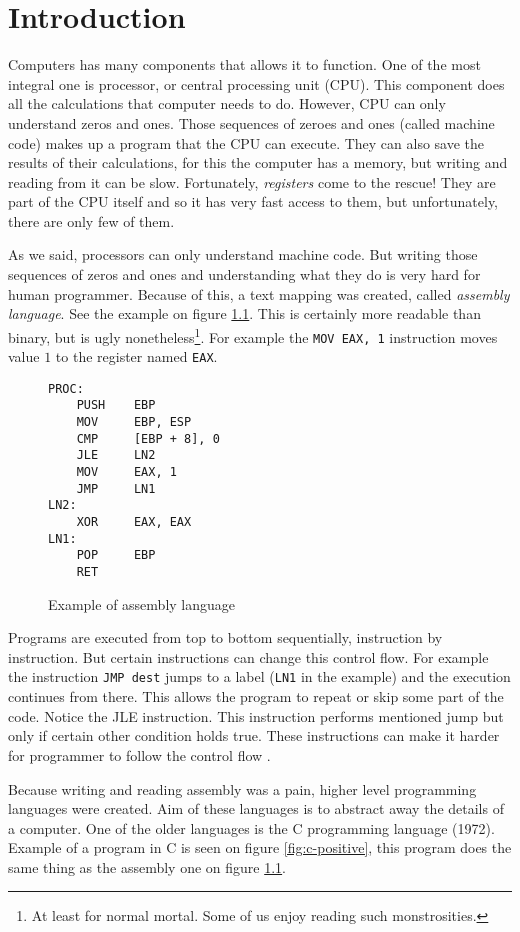 \chapter{Introduction}
Computers has many components that allows it to function. One of the most
integral one is processor, or central processing unit (CPU). This component
does all the calculations that computer needs to do. However, CPU can only
understand zeros and ones. Those sequences of zeroes and ones (called machine
code) makes up a program that the CPU can execute. They can also save the
results of their calculations, for this the computer has a memory, but writing
and reading from it can be slow. Fortunately, \textit{registers} come to the
rescue! They are part of the CPU itself and so it has very fast access to them,
but unfortunately, there are only few of them.

As we said, processors can only understand machine code. But writing those
sequences of zeros and ones and understanding what they do is very hard for
human programmer. Because of this, a text mapping was created, called
\textit{assembly language}. See the example on figure
\ref{fig:assembly-example}. This is certainly more readable than binary, but is
ugly nonetheless\footnote{At least for normal mortal. Some of us enjoy reading
such monstrosities.}. For example the \texttt{MOV EAX, 1} instruction moves
value $1$ to the register named \texttt{EAX}.

\begin{figure}\label{fig:assembly-example}
\begin{lstlisting}
PROC:
    PUSH    EBP
    MOV     EBP, ESP
    CMP     [EBP + 8], 0
    JLE     LN2
    MOV     EAX, 1
    JMP     LN1
LN2:
    XOR     EAX, EAX
LN1:
    POP     EBP
    RET
\end{lstlisting}
\caption{Example of assembly language}
\end{figure}

Programs are executed from top to bottom sequentially, instruction by
instruction. But certain instructions can change this control flow. For example
the instruction \texttt{JMP dest} jumps to a label (\texttt{LN1} in the
example) and the execution continues from there. This allows the program to
repeat or skip some part of the code. Notice the JLE instruction. This
instruction performs mentioned jump but only if certain other condition holds
true. These instructions can make it harder for programmer to follow the
control flow \cite{gotobad}.

Because writing and reading assembly was a pain, higher level programming
languages were created. Aim of these languages is to abstract away the details
of a computer. One of the older languages is the C programming language (1972).
Example of a program in C is seen on figure \ref{fig:c-positive}, this program
does the same thing as the assembly one on figure \ref{fig:assembly-example}.

